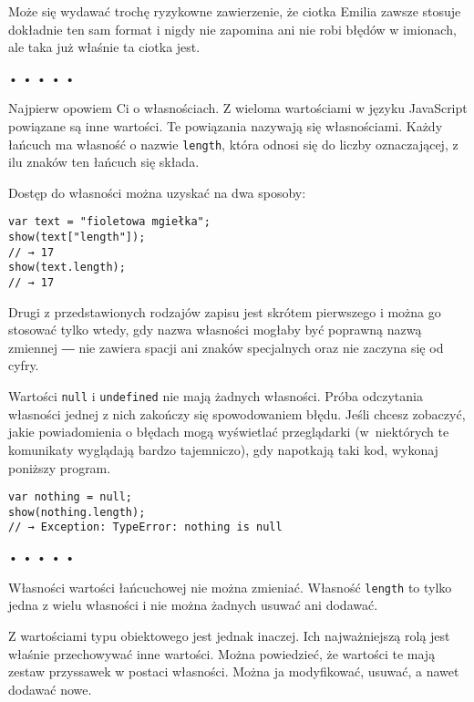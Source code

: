 Może się wydawać trochę ryzykowne zawierzenie, że ciotka Emilia zawsze stosuje dokładnie ten sam format i nigdy nie zapomina ani nie robi błędów w imionach, ale taka już właśnie ta ciotka jest.

  
  
\begin{center}
• • • • •
\end{center}
  
    
Najpierw opowiem Ci o własnościach. Z wieloma wartościami w języku JavaScript powiązane są inne wartości. Te powiązania nazywają się własnościami. Każdy łańcuch ma własność o nazwie \texttt{length}, która odnosi się do liczby oznaczającej, z ilu znaków ten łańcuch się składa.

    
\index{[]}Dostęp do własności można uzyskać na dwa sposoby:

    
\begin{verbatim} 
var text = "fioletowa mgiełka";
show(text["length"]);
// → 17
show(text.length);
// → 17
\end{verbatim}
    
Drugi z przedstawionych rodzajów zapisu jest skrótem pierwszego i można go stosować tylko wtedy, gdy nazwa własności mogłaby być poprawną nazwą zmiennej ― nie zawiera spacji ani znaków specjalnych oraz nie zaczyna się od cyfry.

    
Wartości \texttt{null} i \texttt{undefined} nie mają żadnych własności. Próba odczytania własności jednej z nich zakończy się spowodowaniem błędu. Jeśli chcesz zobaczyć, jakie powiadomienia o błędach mogą wyświetlać przeglądarki (w~niektórych te komunikaty wyglądają bardzo tajemniczo), gdy napotkają taki kod, wykonaj poniższy program.

    
\begin{verbatim} 
var nothing = null;
show(nothing.length);
// → Exception: TypeError: nothing is null
\end{verbatim}
 
  
\begin{center}
• • • • •
\end{center}
  
    
Własności wartości łańcuchowej nie można zmieniać. Własność \texttt{length} to tylko jedna z wielu własności i nie można żadnych usuwać ani dodawać.

    
Z wartościami typu obiektowego jest jednak inaczej. Ich najważniejszą rolą jest właśnie przechowywać inne wartości. Można powiedzieć, że wartości te mają zestaw przyssawek w postaci własności. Można ja modyfikować, usuwać, a nawet dodawać nowe.

